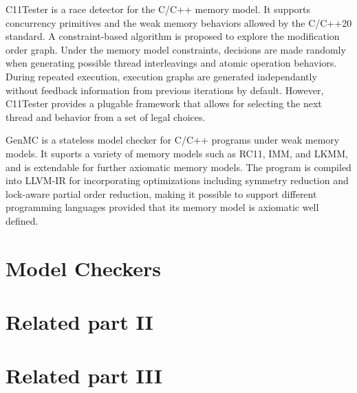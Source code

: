 C11Tester \cite{c11tester} is a race detector for the C/C++ memory model. It supports concurrency primitives and the weak memory behaviors allowed by the C/C++20 standard. A constraint-based algorithm is proposed to explore the modification order graph. Under the memory model constraints, decisions are made randomly when generating possible thread interleavings and atomic operation behaviors. During repeated execution, execution graphs are generated independantly without feedback information from previous iterations by default. However, C11Tester provides a plugable framework that allows for selecting the next thread and behavior from a set of legal choices.   

GenMC \cite{genmc} is a stateless model checker for C/C++ programs under weak memory models. It suports a variety of memory models such as  RC11, IMM, and LKMM, and is extendable for  further axiomatic memory models. The program is compiled into LLVM-IR for incorporating optimizations including symmetry reduction and lock-aware partial order reduction, making it possible to support different programming languages provided that its memory model is axiomatic well defined. 

\section{Model Checkers}
 

\section{Related part II}

   
\section{Related part III}


